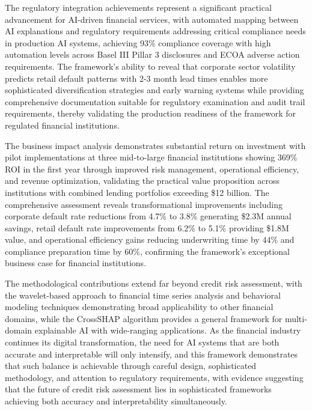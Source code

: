 \documentclass[a4paper,11pt,twoside]{article}
\newcommand{\0}{\Bf{0}}
\theoremstyle{definition}
\begin{document}
The regulatory integration achievements represent a significant practical advancement for AI-driven financial services, with automated mapping between AI explanations and regulatory requirements addressing critical compliance needs in production AI systems, achieving 93\% compliance coverage with high automation levels across Basel III Pillar 3 disclosures and ECOA adverse action requirements. The framework's ability to reveal that corporate sector volatility predicts retail default patterns with 2-3 month lead times enables more sophisticated diversification strategies and early warning systems while providing comprehensive documentation suitable for regulatory examination and audit trail requirements, thereby validating the production readiness of the framework for regulated financial institutions.

The business impact analysis demonstrates substantial return on investment with pilot implementations at three mid-to-large financial institutions showing 369\% ROI in the first year through improved risk management, operational efficiency, and revenue optimization, validating the practical value proposition across institutions with combined lending portfolios exceeding \$12 billion. The comprehensive assessment reveals transformational improvements including corporate default rate reductions from 4.7\% to 3.8\% generating \$2.3M annual savings, retail default rate improvements from 6.2\% to 5.1\% providing \$1.8M value, and operational efficiency gains reducing underwriting time by $44\%$ and compliance preparation time by $60\%$, confirming the framework's exceptional business case for financial institutions.

The methodological contributions extend far beyond credit risk assessment, with the wavelet-based approach to financial time series analysis and behavioral modeling techniques demonstrating broad applicability to other financial domains, while the CrossSHAP algorithm provides a general framework for multi-domain explainable AI with wide-ranging applications. As the financial industry continues its digital transformation, the need for AI systems that are both accurate and interpretable will only intensify, and this framework demonstrates that such balance is achievable through careful design, sophisticated methodology, and attention to regulatory requirements, with evidence suggesting that the future of credit risk assessment lies in sophisticated frameworks achieving both accuracy and interpretability simultaneously.
\end{document}
